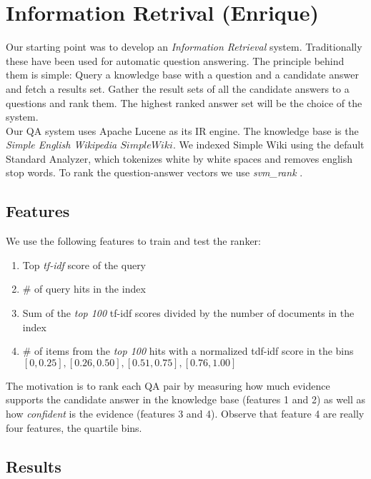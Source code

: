 \section{Information Retrival (Enrique)}
Our starting point was to develop an \emph{Information Retrieval} system. Traditionally these have been used for automatic question answering. The principle behind them is simple: Query a knowledge base with a question and a candidate answer and fetch a results set.  Gather the result sets of all the candidate answers to a questions and rank them. The highest ranked answer set will be the choice of the system.\\

Our QA system uses Apache Lucene \cite{lucene} as its IR engine. The knowledge base is the \emph{Simple English Wikipedia \(Simple Wiki\)}. We indexed Simple Wiki using the default Standard Analyzer, which tokenizes white by white spaces and removes english stop words. To rank the question-answer vectors we use \emph{svm\_rank} \cite{svmrank}.

\subsection{Features}

We use the following features to train and test the ranker:

\begin{enumerate}
\item Top \emph{tf-idf} score of the query
\item \# of query hits in the index
\item Sum of the \emph{top 100} tf-idf scores divided by the number of documents in the index
\item \# of items from the \emph{top 100} hits with a normalized tdf-idf score in the bins $[0, 0.25], [0.26, 0.50], [0.51, 0.75],  [0.76, 1.00]$
\end{enumerate}

The motivation is to rank each QA pair by measuring how much evidence supports the candidate answer in the knowledge base (features 1 and 2) as well as how \emph{confident} is the evidence (features 3 and 4). Observe that feature 4 are really four features, the quartile bins.\\

\subsection{Results}

